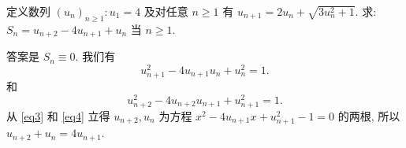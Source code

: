 \begin{prob}
\label{prob:prob-10}
定义数列 $(u_n)_{n\ge 1}: u_1 = 4$ 及对任意
$n\ge 1$ 有 $u_{n+1} = 2u_n + \sqrt{3u_n^2 + 1}$.
求: $S_n = u_{n+2} - 4u_{n+1} + u_n$ 当 $n\ge 1$.
\end{prob}

\begin{soln}
答案是 $\boxed{S_n \equiv 0.}$ 我们有
\begin{equation}
\label{eq3}
u_{n+1}^2 - 4u_{n+1}u_n + u_n^2 = 1.
\end{equation}
和
\begin{equation}
\label{eq4}
u_{n+2}^2 - 4u_{n+2}u_{n+1} + u_{n+1}^2 = 1.
\end{equation}
从 \cref{eq3} 和 \cref{eq4} 立得 $u_{n+2}, u_{n}$
为方程 $x^2 - 4u_{n+1}x + u_{n+1}^2 - 1 = 0$ 的两根,
所以 $u_{n+2} + u_n = 4u_{n+1}$.
\end{soln}

